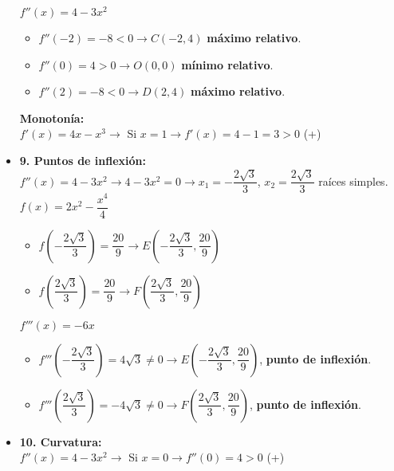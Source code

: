 \begin{itemize}
\begin{itemize}
		\end{itemize}
		$f''(x)=4-3x^2$
		\begin{itemize}
			\item $f''(-2)=-8 <0 \rightarrow C(-2,4)$ \textbf{máximo relativo}.\\
			\item $f''(0)=4 >0 \rightarrow O(0,0)$ \textbf{mínimo relativo}.\\
			\item $f''(2)=-8 <0 \rightarrow D(2,4)$ \textbf{máximo relativo}.\\
		\end{itemize}
		\textbf{Monotonía:}\\
		$f'(x)=4x-x^3 \rightarrow$ Si $x=1 \rightarrow f'(x)=4-1=3 > 0$ (+)
	\item \textbf{9. Puntos de inflexión:}\\
	$f''(x)= 4-3x^2 \rightarrow 4-3x^2=0 \rightarrow x_1= -\dfrac{2\sqrt{3}}{3}$, $x_2=\dfrac{2\sqrt{3}}{3}$ raíces simples.\\
	$f(x) = 2x^2-\dfrac{x^4}{4}$
	\begin{itemize}
		\item $f(-\dfrac{2\sqrt{3}}{3}) = \dfrac{20}{9} \rightarrow E(-\dfrac{2\sqrt{3}}{3}, \dfrac{20}{9})$
		\item $f(\dfrac{2\sqrt{3}}{3}) = \dfrac{20}{9} \rightarrow F(\dfrac{2\sqrt{3}}{3}, \dfrac{20}{9})$
	\end{itemize}
	$f'''(x)=-6x$
	\begin{itemize}
		\item $f'''(-\dfrac{2\sqrt{3}}{3}) = 4\sqrt{3} \neq 0 \rightarrow E(-\dfrac{2\sqrt{3}}{3}, \dfrac{20}{9})$, \textbf{punto de inflexión}.
		\item $f'''(\dfrac{2\sqrt{3}}{3}) = -4\sqrt{3} \neq 0 \rightarrow F(\dfrac{2\sqrt{3}}{3}, \dfrac{20}{9})$, \textbf{punto de inflexión}.
	\end{itemize}
	\item \textbf{10. Curvatura:}\\
	$f''(x)=4-3x^2 \rightarrow$ Si $x=0 \rightarrow f''(0)=4 > 0$ (+)
\end{itemize}
